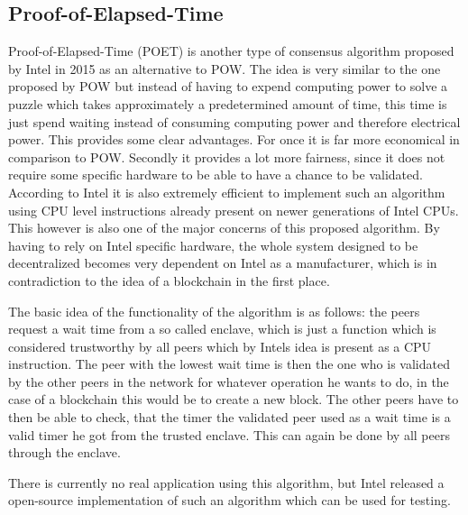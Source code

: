 \subsection{Proof-of-Elapsed-Time}

Proof-of-Elapsed-Time (POET) is another type of consensus algorithm proposed by Intel in 2015 as an alternative to POW. The idea is very similar to the one proposed by POW but instead of having
to expend computing power to solve a puzzle which takes approximately a predetermined amount of time, this time is just spend waiting instead of consuming computing power and therefore
electrical power. This provides some clear advantages. For once it is far more economical in comparison to POW. Secondly it provides a lot more fairness, since it does not require some
specific hardware to be able to have a chance to be validated. According to Intel it is also extremely efficient to implement such an algorithm using CPU level instructions already present on
newer generations of Intel CPUs. This however is also one of the major concerns of this proposed algorithm. By having to rely on Intel specific hardware, the whole system designed to be
decentralized becomes very dependent on Intel as a manufacturer, which is in contradiction to the idea of a blockchain in the first place.\cite{url:coinbase_consensus}\par
The basic idea of the functionality of the algorithm is as follows: the peers request a wait time from a so called enclave, which is just a function which is considered trustworthy by all peers
which by Intels idea is present as a CPU instruction. The peer with the lowest wait time is then the one who is validated by the other peers in the network for whatever operation he wants to do,
in the case of a blockchain this would be to create a new block. The other peers have to then be able to check, that the timer the validated peer used as a wait time is a valid timer he got from the
trusted enclave. This can again be done by all peers through the enclave.\par
There is currently no real application using this algorithm, but Intel released a open-source implementation of such an algorithm which can be used for testing.\cite{url:poet}
